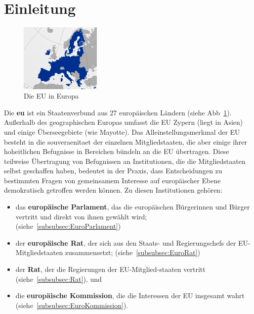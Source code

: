 \section{Einleitung}\label{sec:02_01_einleitung}
\noindent
\begin{figure}
  \begin{center}
    \includegraphics[width=0.35\textwidth]{images/EU_Globe.jpg}
  \end{center}
  \caption{Die EU in Europa}
  \label{fig:EUEuropa}
\end{figure}
\noindent
Die \textbf{\gls{eu}} ist ein Staatenverbund aus 27 europäischen Ländern (siehe Abb~\ref{fig:EUEuropa}). Außerhalb des geographischen Europas umfasst die EU Zypern (liegt in Asien) und einige Überseegebiete (wie Mayotte). Das Alleinstellungsmerkmal der EU besteht in die \gls{souveraenitaet} der einzelnen Mitgliedstaaten, die aber einige ihrer hoheitlichen Befugnisse in Bereichen bündeln an die EU übertragen. \newline
Diese teilweise Übertragung von Befugnissen an Institutionen, die die Mitgliedstaaten selbst geschaffen haben, bedeutet in der Praxis, dass Entscheidungen zu bestimmten Fragen von gemeinsamem Interesse auf europäischer Ebene demokratisch getroffen werden können. Zu diesen Institutionen gehören:
\newline
\begin{itemize}
  \item das \textbf{europäische Parlament}, das die europäischen Bürgerinnen und Bürger vertritt und direkt von ihnen gewählt wird; (siehe~\ref{subsubsec:EuroParlament})
  \item der \textbf{europäische Rat}, der sich aus den Staats- und Regierungschefs der EU-Mitgliedstaaten zusammensetzt; (siehe~\ref{subsubsec:EuroRat})
  \item der \textbf{Rat}, der die Regierungen der EU-Mitglied-staaten vertritt  (siehe~\ref{subsubsec:Rat}), und
  \item die \textbf{europäische Kommission}, die die Interessen der EU insgesamt wahrt  (siehe~\ref{subsubsec:EuroKommission}).
\end{itemize}
